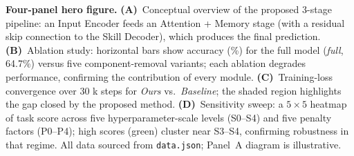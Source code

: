 \caption{\textbf{Four-panel hero figure.}
\textbf{(A)}~Conceptual overview of the proposed 3-stage pipeline: an Input Encoder feeds
an Attention + Memory stage (with a residual skip connection to the Skill Decoder),
which produces the final prediction.
\textbf{(B)}~Ablation study: horizontal bars show accuracy (\%) for the full model
(\emph{full}, 64.7\%) versus five component-removal variants; each ablation degrades
performance, confirming the contribution of every module.
\textbf{(C)}~Training-loss convergence over 30 k steps for \emph{Ours} vs.\ \emph{Baseline};
the shaded region highlights the gap closed by the proposed method.
\textbf{(D)}~Sensitivity sweep: a $5{\times}5$ heatmap of task score across five
hyperparameter-scale levels (S0--S4) and five penalty factors (P0--P4); high scores
(green) cluster near S3--S4, confirming robustness in that regime.
All data sourced from \texttt{data.json}; Panel~A diagram is illustrative.}

